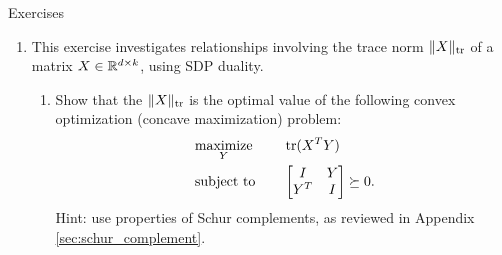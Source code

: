 \begin{xcb}{Exercises}
\begin{enumerate}[label=\thechapter.\arabic*]
\begin{enumerate}[label=\alph*.]
\item Show that for an LP, the duality gap $f^\star - g^\star$ can only ever be
  $0$ or $+\infty$. Hint: parts a and b of Exercise \ref{ex:lp_slater}. 

\item Show that for an SDP, the duality gap $f^\star - g^\star$ can be positive
  and finite, by studying the example 
  \begin{alignat*}{2}
   &\minimize_x \quad && x_2 \\
   &\st \quad && 
   \begin{bmatrix}
   x_2 & 0 & 0 \\
   0 & x_1 & x_2 \\
   0 & x_2 & 0 
 \end{bmatrix} \preceq  
 \begin{bmatrix}
  \alpha & 0 & 0 \\
  0 & 0 & 0 \\
  0 & 0 & 0 
 \end{bmatrix}.
  \end{alignat*}
  for arbitrary $\alpha > 0$. Compute the primal optimal value, then compute the
  dual optimal value, to conclude that the duality gap is $\alpha$. Explain why 
  this example does not violate Theorem \ref{thm:slater_conic}. Note: this
  example is taken from \cite{ramana1997exact}, who in turn credits
  \cite{vandenberghe1996semidefinite} for a related example.  
\end{enumerate}

\item \label{ex:trace_norm_semidefinite} 
  This exercise investigates relationships involving the trace norm
  $\|X\|_{\operatorname{tr}}$ of a matrix $X \in \mathbb{R}^{d \times k}$, using SDP duality. 

\begin{enumerate}[label=\alph*.]
\item Show that the $\|X\|_{\operatorname{tr}}$ is the optimal value of the following convex
  optimization (concave maximization) problem:
  \begin{alignat*}{2}
  &\operatorname*{maximize}_Y \quad && \operatorname{tr}(X^T Y) \\
  &\operatorname{subject\,\,to} \quad && \begin{bmatrix} I & Y \\ 
    Y^T & I \end{bmatrix} \succeq 0.
  \end{alignat*}
  Hint: use properties of Schur complements, as reviewed in Appendix
  \ref{sec:schur_complement}.


\end{enumerate}
\end{enumerate}
\end{xcb}
